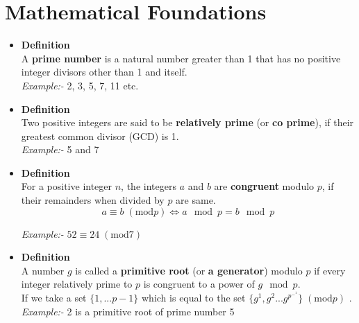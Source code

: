 \documentclass[12pt]{article}
\begin{document}
   \section{Mathematical Foundations}
             \begin{itemize}
			    \item \textbf{Definition}\\
			    A \textbf{prime number} is a natural number greater than 1 that has no positive integer divisors other than 1 and itself.\\
			    \vspace{3mm}
			   \textit{Example:-} 2, 3, 5, 7, 11 etc.\\
			     
			     \item \textbf{Definition}\\
			    Two positive integers are said to be \textbf{relatively prime} (or \textbf{ co prime}), if their greatest common divisor (GCD) is 1.\\
			    \vspace{3mm}
                 \textit{Example:-} 5 and 7
               \item \textbf{Definition}\\
                 For a positive integer $n$, the integers $a$ and $b$ are \textbf{congruent} modulo $p$, if their remainders when divided by $p$ are same.
                 $$ a \equiv b \;(\text{mod} p) \iff a \mod p = b \mod p $$ 
                
                 \textit{Example:-}
                  $52 \equiv 24 \;(\text{mod} 7)$\\
          \item \textbf{Definition}\\
                 A  number $g$ is called a \textbf{primitive root} (or \textbf{a generator}) modulo $p$ if every integer relatively prime to $p$ is congruent to a power of $ g \mod p$.\\
                 \vspace{2mm}
                   If we take a set $\{1,...p-1\}$ which is equal to the set $ \{g^1,g^2 ...g^p^-^1 \} \;(\text{mod} p)$ .\\
                 \vspace{3mm}
			    \textit{Example:-} 2 is a primitive root of prime number 5 \\
       \end{itemize}
  
\end{document}
